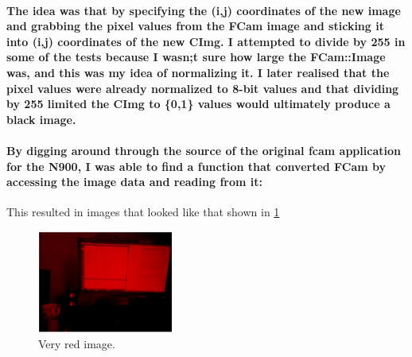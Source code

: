 \paragraph{The idea was that by specifying the (i,j) coordinates of the new image and grabbing the pixel values from the FCam image and sticking it into (i,j) coordinates of the new CImg. I attempted to divide by 255 in some of the tests because I wasn;t sure how large the FCam::Image was, and this was my idea of normalizing it. I later realised that the pixel values were already normalized to 8-bit values and that dividing by 255 limited the CImg to \{0,1\} values would ultimately produce a black image.}
\paragraph{By digging around through the source of the original fcam application for the N900, I was able to find a function that converted FCam by accessing the image data and reading from it:}
\begin{frame}[fragile]

\end{frame}
This resulted in images that looked like that shown in \cref{img:red}
\begin{figure}
        	\vspace{0pt}\hspace{-200pt}
	\centering
		\includegraphics[width=0.4\textwidth]{../images/redbuffer1}\hspace{-200pt}
	\caption{Very red image.}\hspace{-200pt}
	\label{img:red}\hspace{-200pt}
\end{figure}


